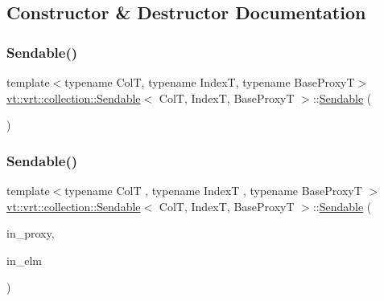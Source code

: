 \subsection{Constructor \& Destructor Documentation}
\mbox{\label{structvt_1_1vrt_1_1collection_1_1_sendable_a26f7014b7bb14f0e4b758b5b076834f1}} 
\subsubsection{\texorpdfstring{Sendable()}{Sendable()}\hspace{0.1cm}{\footnotesize\ttfamily [1/2]}}
{\footnotesize\ttfamily template$<$typename ColT, typename IndexT, typename Base\+ProxyT$>$ \\
\hyperlink{structvt_1_1vrt_1_1collection_1_1_sendable}{vt\+::vrt\+::collection\+::\+Sendable}$<$ ColT, IndexT, Base\+ProxyT $>$\+::\hyperlink{structvt_1_1vrt_1_1collection_1_1_sendable}{Sendable} (\begin{DoxyParamCaption}{ }\end{DoxyParamCaption})\hspace{0.3cm}{\ttfamily [default]}}

\mbox{\label{structvt_1_1vrt_1_1collection_1_1_sendable_aa4b3473480b076117715d1d21b53919b}} 
\subsubsection{\texorpdfstring{Sendable()}{Sendable()}\hspace{0.1cm}{\footnotesize\ttfamily [2/2]}}
{\footnotesize\ttfamily template$<$typename ColT , typename IndexT , typename Base\+ProxyT $>$ \\
\hyperlink{structvt_1_1vrt_1_1collection_1_1_sendable}{vt\+::vrt\+::collection\+::\+Sendable}$<$ ColT, IndexT, Base\+ProxyT $>$\+::\hyperlink{structvt_1_1vrt_1_1collection_1_1_sendable}{Sendable} (\begin{DoxyParamCaption}\item[{typename Base\+Proxy\+T\+::\+Proxy\+Type const \&}]{in\+\_\+proxy,  }\item[{typename Base\+Proxy\+T\+::\+Element\+Proxy\+Type const \&}]{in\+\_\+elm }\end{DoxyParamCaption})}



